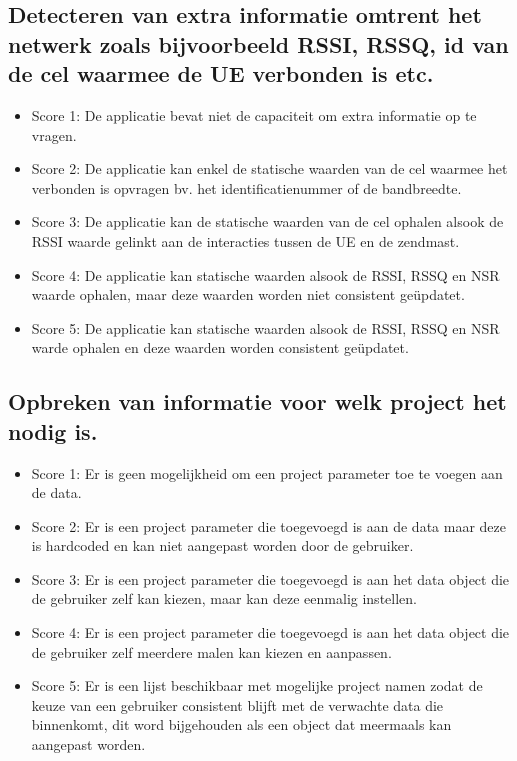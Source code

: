 \subsection{Detecteren van extra informatie omtrent het netwerk zoals bijvoorbeeld RSSI, RSSQ, id van de cel waarmee de UE verbonden is etc.}

\begin{itemize}
    \item Score 1: De applicatie bevat niet de capaciteit om extra informatie op te vragen.
    \item Score 2: De applicatie kan enkel de statische waarden van de cel waarmee het verbonden is opvragen bv. het identificatienummer of de bandbreedte.
    \item Score 3: De applicatie kan de statische waarden van de cel ophalen alsook de RSSI waarde gelinkt aan de interacties tussen de UE en de zendmast.
    \item Score 4: De applicatie kan statische waarden alsook de RSSI, RSSQ en NSR waarde ophalen, maar deze waarden worden niet consistent geüpdatet.
    \item Score 5: De applicatie kan statische waarden alsook de RSSI, RSSQ en NSR warde ophalen en deze waarden worden consistent geüpdatet.
\end{itemize}

\subsection{Opbreken van informatie voor welk project het nodig is.}
\begin{itemize}
    \item Score 1: Er is geen mogelijkheid om een project parameter toe te voegen aan de data.
    \item Score 2: Er is een project parameter die toegevoegd is aan de data maar deze is hardcoded en kan niet aangepast worden door de gebruiker.
    \item Score 3: Er is een project parameter die toegevoegd is aan het data object die de gebruiker zelf kan kiezen, maar kan deze eenmalig instellen. 
    \item Score 4: Er is een project parameter die toegevoegd is aan het data object die de gebruiker zelf meerdere malen kan kiezen en aanpassen.
    \item Score 5: Er is een lijst beschikbaar met mogelijke project namen zodat de keuze van een gebruiker consistent blijft met de verwachte data die binnenkomt, dit word bijgehouden als een object dat meermaals kan aangepast worden.
\end{itemize}

